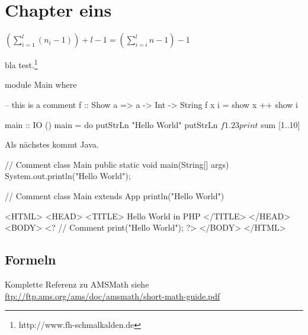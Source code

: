 \chapter{Chapter eins}

$(\sum_{i=1}^{l}(n_i - 1)) + l - 1 = (\sum_{i=i}^{l} n - 1) - 1$


bla test.\footnote{http://www.fh-schmalkalden.de}


\begin{code}[label=listinghaskell,caption=This is Haskell]
module Main where

-- this is a comment
f :: Show a => a -> Int -> String
f x i = show x ++ show i

main :: IO ()
main = do
  putStrLn "Hello World"
  putStrLn $ f 1.2 3
  print $ sum [1..10]
\end{code}

Als nächstes kommt Java.%

\begin{code}[label=listingjava,caption={This is Java}]
// Comment
class Main {
  public static void main(String[] args) {
    System.out.println("Hello World");
  }
}
\end{code}

\begin{code}[label=listingscala,caption=This is Scala]
// Comment
class Main extends App {
  println("Hello World")
}
\end{code}

\begin{Code}
	\centering
	
\end{Code}
\begin{code}[label=listingphp,caption={This is PHP}]
<HTML>
<HEAD>
<TITLE> Hello World in PHP </TITLE>
</HEAD>
<BODY>
<?
// Comment
 print("Hello World");
?>
</BODY>
</HTML>
\end{code}

\section{Formeln}

Komplette Referenz zu AMSMath siehe \\
\url{ftp://ftp.ams.org/ams/doc/amsmath/short-math-guide.pdf}


